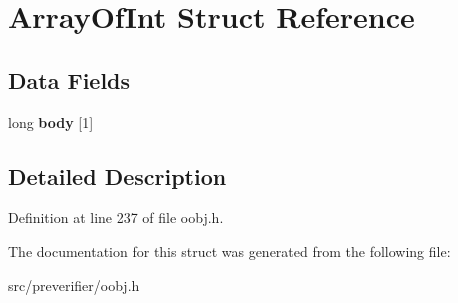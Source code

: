 \section{ArrayOfInt Struct Reference}
\label{struct_array_of_int}
\subsection*{Data Fields}
\begin{DoxyCompactItemize}
\item 
long {\bfseries body} [1]\label{struct_array_of_int_abec26a378f2a6c885f11a631ec3e284e}

\end{DoxyCompactItemize}


\subsection{Detailed Description}


Definition at line 237 of file oobj.h.



The documentation for this struct was generated from the following file:\begin{DoxyCompactItemize}
\item 
src/preverifier/oobj.h\end{DoxyCompactItemize}
